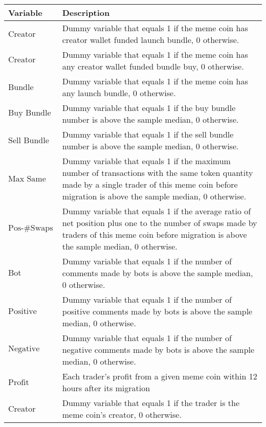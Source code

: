 \begin{tabularx}{\textwidth}{lX}\hline
Variable & Description \\
\hline
$\text{Creator Bundle Launch}$ & Dummy variable that equals 1 if the meme coin has creator wallet funded launch bundle, 0 otherwise. \\
$\text{Creator Bundle Buy}$ & Dummy variable that equals 1 if the meme coin has any creator wallet funded bundle buy, 0 otherwise. \\
$\text{Bundle Launch}$ & Dummy variable that equals 1 if the meme coin has any launch bundle, 0 otherwise. \\
$\text{Buy Bundle}$ & Dummy variable that equals 1 if the buy bundle number is above the sample median, 0 otherwise. \\
$\text{Sell Bundle}$ & Dummy variable that equals 1 if the sell bundle number is above the sample median, 0 otherwise. \\
$\text{Max Same Txn}$ & Dummy variable that equals 1 if the maximum number of transactions with the same token quantity made by a single trader of this meme coin before migration is above the sample median, 0 otherwise. \\
$\text{Pos-\#Swaps Ratio}$ & Dummy variable that equals 1 if the average ratio of net position plus one to the number of swaps made by traders of this meme coin before migration is above the sample median, 0 otherwise. \\
$\text{Bot Comment}$ & Dummy variable that equals 1 if the number of comments made by bots is above the sample median, 0 otherwise. \\
$\text{Positive Comment Bot}$ & Dummy variable that equals 1 if the number of positive comments made by bots is above the sample median, 0 otherwise. \\
$\text{Negative Comment Bot}$ & Dummy variable that equals 1 if the number of negative comments made by bots is above the sample median, 0 otherwise. \\
$\text{Profit}$ & Each trader's profit from a given meme coin within 12 hours after its migration \\
$\text{Creator}$ & Dummy variable that equals 1 if the trader is the meme coin's creator, 0 otherwise. \\
\hline
\end{tabularx}

